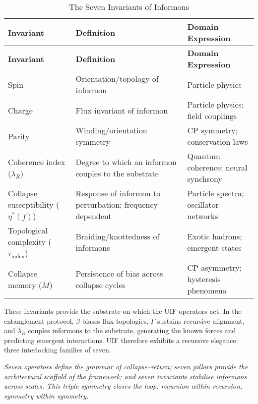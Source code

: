 \noindent
\begin{longtable}{@{} p{} p{} p{} @{}}
\caption{The Seven Invariants of Informons}\label{tab:seven-invariants}\\
\toprule
\textbf{Invariant} & \textbf{Definition} & \textbf{Domain Expression} \\
\midrule
\endfirsthead
\toprule
\textbf{Invariant} & \textbf{Definition} & \textbf{Domain Expression} \\
\midrule
\endhead
\bottomrule
\endfoot

Spin & Orientation/topology of informon & Particle physics \\
Charge & Flux invariant of informon & Particle physics; field couplings \\
Parity & Winding/orientation symmetry & CP symmetry; conservation laws \\
Coherence index (\mbox{$\lambda_R$}) & Degree to which an informon couples to the substrate & Quantum coherence; neural synchrony \\
Collapse susceptibility (\mbox{$\eta^{*}(f)$}) & Response of informon to perturbation; frequency dependent & Particle spectra; oscillator networks \\
Topological complexity (\mbox{$\tau_{\text{index}}$}) & Braiding/knottedness of informons & Exotic hadrons; emergent states \\
Collapse memory (\mbox{$M$}) & Persistence of bias across collapse cycles & CP asymmetry; hysteresis phenomena \\

\end{longtable}

\noindent


\noindent These invariants provide the substrate on which the UIF operators act. In the entanglement protocol, $\beta$ biases flux topologies, $\Gamma$ sustains recursive alignment, and $\lambda_R$ couples informons to the substrate, generating the known forces and predicting emergent interactions. UIF therefore exhibits a recursive elegance: three interlocking families of seven. 
\newline

\noindent \textit{Seven operators define the grammar of collapse–return; seven pillars provide the architectural scaffold of the framework; and seven invariants stabilise informons across scales. This triple symmetry closes the loop: recursion within recursion, symmetry within symmetry.} 
\newline

